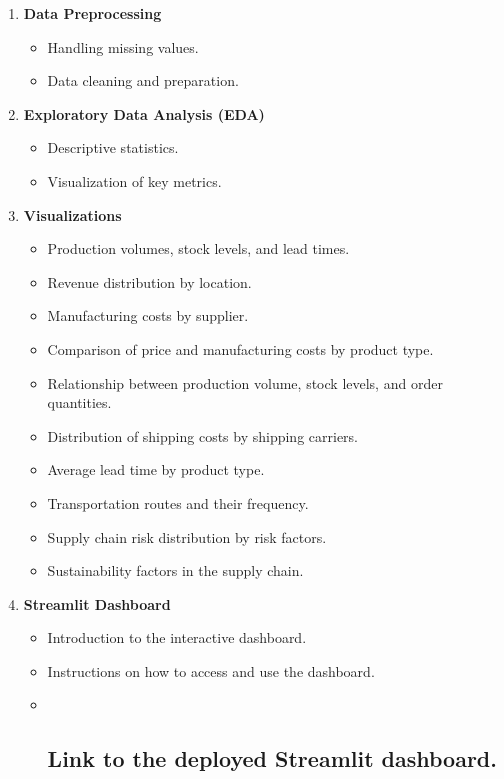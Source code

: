 \documentclass[11pt]{article}
\providecommand{\tightlist}{%
      \setlength{\itemsep}{0pt}\setlength{\parskip}{0pt}}
\begin{document}
\begin{enumerate}
\def\labelenumi{\arabic{enumi}.}
\tightlist
\item
  \textbf{Data Preprocessing}

  \begin{itemize}
  \tightlist
  \item
    Handling missing values.
  \item
    Data cleaning and preparation.
  \end{itemize}
\item
  \textbf{Exploratory Data Analysis (EDA)}

  \begin{itemize}
  \tightlist
  \item
    Descriptive statistics.
  \item
    Visualization of key metrics.
  \end{itemize}
\item
  \textbf{Visualizations}

  \begin{itemize}
  \tightlist
  \item
    Production volumes, stock levels, and lead times.
  \item
    Revenue distribution by location.
  \item
    Manufacturing costs by supplier.
  \item
    Comparison of price and manufacturing costs by product type.
  \item
    Relationship between production volume, stock levels, and order
    quantities.
  \item
    Distribution of shipping costs by shipping carriers.
  \item
    Average lead time by product type.
  \item
    Transportation routes and their frequency.
  \item
    Supply chain risk distribution by risk factors.
  \item
    Sustainability factors in the supply chain.
  \end{itemize}
\item
  \textbf{Streamlit Dashboard}

  \begin{itemize}
  \item
    Introduction to the interactive dashboard.
  \item
    Instructions on how to access and use the dashboard.
  \item ~
    \subsection{Link to the deployed Streamlit
    dashboard.}\label{link-to-the-deployed-streamlit-dashboard.}
  \end{itemize}
\end{enumerate}
\end{document}
